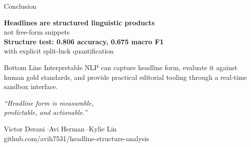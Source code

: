 \documentclass[aspectratio=169, 11pt]{beamer}
\begin{document}
\begin{frame}{Conclusion}
  \begin{center}
    \Large
    \textcolor{accent}{\textbf{Headlines are structured linguistic products}}\\[0.4em]
    \large not free-form snippets\\[1.0em]

    \textcolor{accentblue}{\textbf{Structure test: 0.806 accuracy, 0.675 macro F1}}\\[0.4em]
    \textcolor{textsub}{with explicit split-luck quantification}
  \end{center}

  \vspace{1.4em}

  \begin{block}{Bottom Line}
    Interpretable NLP can capture headline form, evaluate it against human gold standards, and provide practical editorial tooling through a real-time sandbox interface.
  \end{block}
\end{frame}

\begin{frame}[plain]
  \begin{center}
    \vspace{2.5em}
    \Huge
    \textit{``Headline form is measurable,}\\[0.3em]
    \textit{predictable, and actionable.''}

    \vspace{2.5em}
    \normalsize
    \textcolor{textsub}{Victor Derani \quad$\cdot$\quad Avi Herman \quad$\cdot$\quad Kylie Lin}\\[0.3em]
    \textcolor{textsub}{\small github.com/avih7531/headline-structure-analysis}
  \end{center}
\end{frame}
\end{document}
